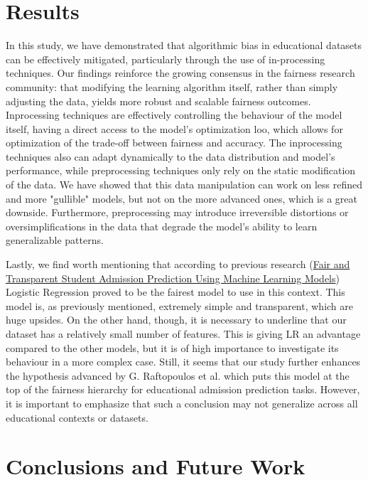 \documentclass{article}
\begin{document}
\section{Results}
In this study, we have demonstrated that algorithmic bias in educational datasets can be effectively mitigated, particularly through the use of in-processing techniques.
Our findings reinforce the growing consensus in the fairness research community: that modifying the learning algorithm itself, rather than simply adjusting the data, yields more robust and scalable fairness outcomes. Inprocessing techniques are effectively controlling the behaviour of the model itself, having a direct access to the model's optimization loo, which allows for optimization of the trade-off between fairness and accuracy. The inprocessing techniques also can adapt dynamically to the data distribution and model's performance, while preprocessing techniques only rely on the static modification of the data. We have showed that this data manipulation can work on less refined and more "gullible" models, but not on the more advanced ones, which is a great downside. Furthermore, preprocessing may introduce irreversible distortions or oversimplifications in the data that degrade the model’s ability to learn generalizable patterns.

Lastly, we find worth mentioning that according to previous research (\href{https://www.researchgate.net/publication/387044808_Fair_and_Transparent_Student_Admission_Prediction_Using_Machine_Learning_Models#read}{Fair and Transparent Student Admission Prediction Using Machine Learning Models}) Logistic Regression proved to be the fairest model to use in this context. This model is, as previously mentioned, extremely simple and transparent, which are huge upsides. On the other hand, though, it is necessary to underline that our dataset has a relatively small number of features. This is giving LR an advantage compared to the other models, but it is of high importance to investigate its behaviour in a more complex case. Still, it seems that our study further enhances the hypothesis advanced by G. Raftopoulos et al. which puts this model at the top of the fairness hierarchy for educational admission prediction tasks. However, it is important to emphasize that such a conclusion may not generalize across all educational contexts or datasets. 


\section{Conclusions and Future Work}
\end{document}
